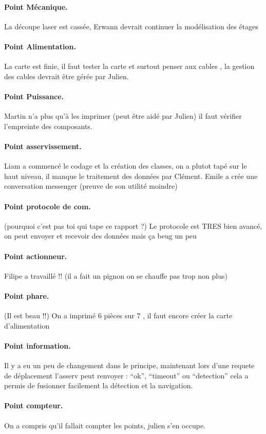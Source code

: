 \documentclass[a4paper,10pt]{report}
\begin{document}
\begin{spacing}{1.5}
\paragraph{Point Mécanique.} La découpe laser est cassée, Erwann devrait continuer la modélisation des étages
\paragraph{Point Alimentation.} La carte est finie, il faut tester la carte et
surtout penser aux cables , la gestion des cables devrait être gérée par Julien.
\paragraph{Point Puissance.} Martin n'a plus qu'à les imprimer (peut être aidé
par Julien) il faut vérifier l'empreinte des composants.
\paragraph{Point asservissement.} Liam a commencé le codage et la création des
classes, on a plutot tapé sur le haut niveau, il manque le traitement des
données par Clément. Emile a crée une conversation messenger (preuve de son
utilité moindre)
\paragraph{Point protocole de com.} (pourquoi c'est pas toi qui tape ce rapport
?) Le protocole est TRES bien avancé, on peut envoyer et recevoir des données
mais ça beug un peu
\paragraph{Point actionneur.} Filipe a travaillé !! (il a fait un pignon on se
chauffe pas trop non plus)
\paragraph{Point phare.} (Il est beau !!) On a imprimé 6 pièces sur 7 , il faut
encore créer la carte d'alimentation
\paragraph{Point information.} Il y a eu un peu de changement dans le principe,
maintenant lors d'une requete de déplacement l'asserv peut renvoyer : ``ok'',
``timeout'' ou ``detection'' cela a permis de fusionner facilement la détection
et la navigation.
\paragraph{Point compteur.} On a compris qu'il fallait compter les points,
julien s'en occupe.


\end{spacing}
\end{document}
